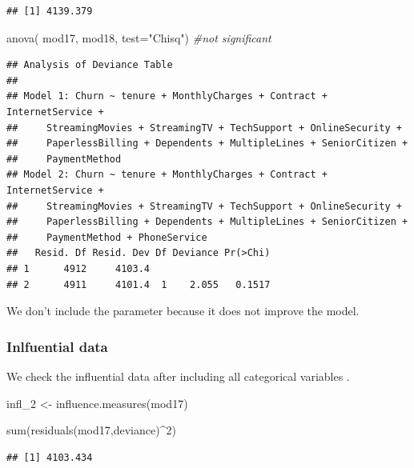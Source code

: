 \documentclass[
  twoside]{article}
\newenvironment{Shaded}{\begin{snugshade}}{\end{snugshade}}
\newcommand{\AttributeTok}[1]{\textcolor[rgb]{0.77,0.63,0.00}{#1}}
\newcommand{\CommentTok}[1]{\textcolor[rgb]{0.56,0.35,0.01}{\textit{#1}}}
\newcommand{\DecValTok}[1]{\textcolor[rgb]{0.00,0.00,0.81}{#1}}
\newcommand{\FunctionTok}[1]{\textcolor[rgb]{0.00,0.00,0.00}{#1}}
\newcommand{\NormalTok}[1]{#1}
\newcommand{\OtherTok}[1]{\textcolor[rgb]{0.56,0.35,0.01}{#1}}
\newcommand{\SpecialCharTok}[1]{\textcolor[rgb]{0.00,0.00,0.00}{#1}}
\newcommand{\StringTok}[1]{\textcolor[rgb]{0.31,0.60,0.02}{#1}}
\begin{document}
\begin{verbatim}
## [1] 4139.379
\end{verbatim}

\begin{Shaded}
\begin{Highlighting}[]
\FunctionTok{anova}\NormalTok{( mod17, mod18,  }\AttributeTok{test=}\StringTok{"Chisq"}\NormalTok{) }\CommentTok{\#not significant}
\end{Highlighting}
\end{Shaded}

\begin{verbatim}
## Analysis of Deviance Table
## 
## Model 1: Churn ~ tenure + MonthlyCharges + Contract + InternetService + 
##     StreamingMovies + StreamingTV + TechSupport + OnlineSecurity + 
##     PaperlessBilling + Dependents + MultipleLines + SeniorCitizen + 
##     PaymentMethod
## Model 2: Churn ~ tenure + MonthlyCharges + Contract + InternetService + 
##     StreamingMovies + StreamingTV + TechSupport + OnlineSecurity + 
##     PaperlessBilling + Dependents + MultipleLines + SeniorCitizen + 
##     PaymentMethod + PhoneService
##   Resid. Df Resid. Dev Df Deviance Pr(>Chi)
## 1      4912     4103.4                     
## 2      4911     4101.4  1    2.055   0.1517
\end{verbatim}

We don't include the parameter because it does not improve the model.

\hypertarget{inlfuential-data-1}{%
\subsubsection{Inlfuential data}\label{inlfuential-data-1}}

We check the influential data after including all categorical variables
.

\begin{Shaded}
\begin{Highlighting}[]
\NormalTok{infl\_2 }\OtherTok{\textless{}{-}} \FunctionTok{influence.measures}\NormalTok{(mod17)}

\FunctionTok{sum}\NormalTok{(}\FunctionTok{residuals}\NormalTok{(mod17,}\StringTok{\textquotesingle{}deviance\textquotesingle{}}\NormalTok{)}\SpecialCharTok{\^{}}\DecValTok{2}\NormalTok{)}
\end{Highlighting}
\end{Shaded}

\begin{verbatim}
## [1] 4103.434
\end{verbatim}
\end{document}
